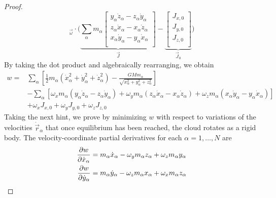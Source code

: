 \documentclass[../psets.tex]{subfiles}
\begin{document}
\begin{enumerate}
\begin{proof}
\begin{equation*}
{            }_{\vec{\omega}}\cdot\Bigg(
                \underbrace{
                    \sum_\alpha m_\alpha
                    \begin{bmatrix}
                        y_\alpha\dot{z}_\alpha-z_\alpha\dot{y}_\alpha\\
                        z_\alpha\dot{x}_\alpha-x_\alpha\dot{z}_\alpha\\
                        x_\alpha\dot{y}_\alpha-y_\alpha\dot{x}_\alpha\\
                    \end{bmatrix}
                }_{\vec{J}}-\underbrace{
                    \begin{bmatrix}
                        J_{x,0}\\
                        J_{y,0}\\
                        J_{z,0}\\
                    \end{bmatrix}
                }_{\vec{J}_0}
            \Bigg)
        \end{equation*}
        By taking the dot product and algebraically rearranging, we obtain
        \begin{equation*}
            \begin{aligned}
                w ={}& \sum_\alpha\left[ \frac{1}{2}m_\alpha(\dot{x}_\alpha^2+\dot{y}_\alpha^2+\dot{z}_\alpha^2)-\frac{GMm_\alpha}{\sqrt{x_\alpha^2+y_\alpha^2+z_\alpha^2}} \right]\\
                & -\sum_\alpha\left[ \omega_xm_\alpha(y_\alpha\dot{z}_\alpha-z_\alpha\dot{y}_\alpha)+\omega_ym_\alpha(z_\alpha\dot{x}_\alpha-x_\alpha\dot{z}_\alpha)+\omega_zm_\alpha(x_\alpha\dot{y}_\alpha-y_\alpha\dot{x}_\alpha) \right]\\
                & +\omega_xJ_{x,0}+\omega_yJ_{y,0}+\omega_zJ_{z,0}
            \end{aligned}
        \end{equation*}
        Taking the next hint, we prove by minimizing $w$ with respect to variations of the velocities $\dot{\vec{r}}_\alpha$ that once equilibrium has been reached, the cloud rotates as a rigid body. The velocity-coordinate partial derivatives for each $\alpha=1,\dots,N$ are
        \begin{align*}
            \pdv{w}{\dot{x}_\alpha} &= m_\alpha\dot{x}_\alpha-\omega_ym_\alpha z_\alpha+\omega_zm_\alpha y_\alpha\\
            \pdv{w}{\dot{y}_\alpha} &= m_\alpha\dot{y}_\alpha-\omega_zm_\alpha x_\alpha+\omega_xm_\alpha z_\alpha\\

\end{align*}
\end{proof}
\end{enumerate}
\end{document}
